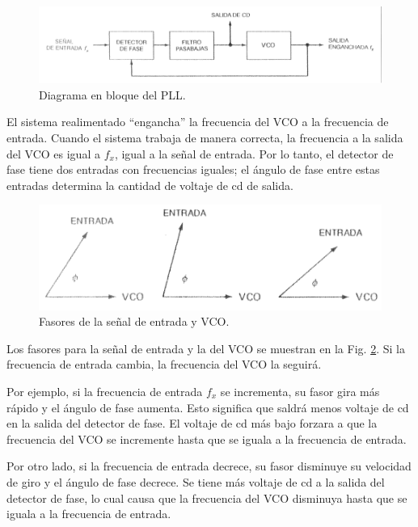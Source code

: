 \documentclass[10pt,a4paper]{IEEEtran}
\begin{document}
    \begin{figure}[H]
        \centering
        \includegraphics[scale=0.2]{pll1.png}
        \caption{Diagrama en bloque del PLL.}
        \label{pll1}
    \end{figure}
    El sistema realimentado “engancha” la frecuencia del VCO a la frecuencia de entrada. Cuando el sistema trabaja de manera correcta, la frecuencia a la salida del VCO es igual a $f_x$, igual a la señal de entrada. Por lo tanto, el 
    detector de fase tiene dos entradas con frecuencias iguales; el ángulo de fase entre estas entradas determina la cantidad de voltaje de cd de salida. 
    
    \begin{figure}[H]
        \centering
        \includegraphics[scale=0.3]{pll2.png}
        \caption{Fasores de la señal de entrada y VCO.}
        \label{pll2}
    \end{figure}
    
    Los fasores para la señal de entrada y la del VCO se muestran en la Fig. \ref{pll2}. Si la frecuencia de entrada cambia, la frecuencia del VCO la seguirá. 
    
    Por ejemplo, si la frecuencia de entrada $f_x$ se incrementa, su fasor gira más rápido y el ángulo de fase aumenta. Esto significa que saldrá menos voltaje de cd en la salida del detector de fase. El voltaje de cd más bajo forzara a que la frecuencia del VCO se incremente hasta que se iguala a la frecuencia de entrada.
    
    Por otro lado, si la frecuencia de entrada decrece, su fasor disminuye su velocidad de giro y el ángulo de fase decrece. Se tiene más voltaje de cd a la salida del detector de fase, lo cual causa que la frecuencia del VCO disminuya hasta que se iguala a la frecuencia de entrada.
    
\end{document}
